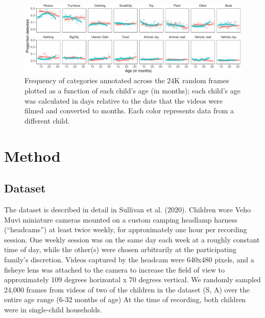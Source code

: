 \documentclass[10pt, letterpaper]{article}
\newenvironment{CodeChunk}{}{}
\begin{document}
\begin{CodeChunk}
\begin{figure}[h]

{\centering \includegraphics[width=\textwidth]{figs/freq_by_category-1} 

}

\caption[Frequency of categories annotated across the 24K random frames plotted as a function of each child's age (in months)]{Frequency of categories annotated across the 24K random frames plotted as a function of each child's age (in months); each child's age was calculated in days relative to the date that the videos were filmed and converted to months. Each color represents data from a different child.}\label{fig:freq_by_category}
\end{figure}
\end{CodeChunk}

\hypertarget{method}{%
\section{Method}\label{method}}

\hypertarget{dataset}{%
\subsection{Dataset}\label{dataset}}

The dataset is described in detail in Sullivan et al. (2020). Children
wore Veho Muvi miniature cameras mounted on a custom camping headlamp
harness (``headcams'') at least twice weekly, for approximately one hour
per recording session. One weekly session was on the same day each week
at a roughly constant time of day, while the other(s) were chosen
arbitrarily at the participating family's discretion. Videos captured by
the headcam were 640x480 pixels, and a fisheye lens was attached to the
camera to increase the field of view to approximately 109 degrees
horizontal x 70 degrees vertical. We randomly sampled 24,000 frames from
videos of two of the children in the dataset (S, A) over the entire age
range (6-32 months of age) At the time of recording, both children were
in single-child households.
\end{document}
